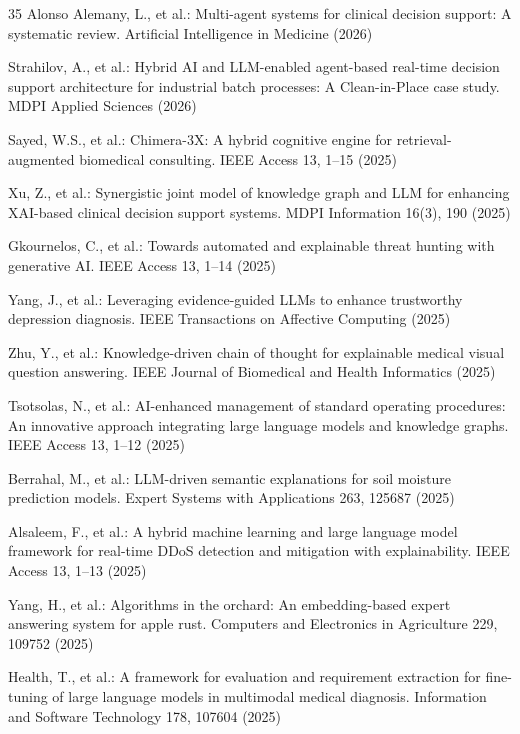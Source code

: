 \documentclass[lnbip]{svmultln}
\begin{document}
\begin{thebibliography}{35}
 Alonso Alemany, L., et al.: Multi-agent systems for clinical decision support: A systematic review. Artificial Intelligence in Medicine (2026)

 Strahilov, A., et al.: Hybrid AI and LLM-enabled agent-based real-time decision support architecture for industrial batch processes: A Clean-in-Place case study. MDPI Applied Sciences (2026)

 Sayed, W.S., et al.: Chimera-3X: A hybrid cognitive engine for retrieval-augmented biomedical consulting. IEEE Access 13, 1--15 (2025)

 Xu, Z., et al.: Synergistic joint model of knowledge graph and LLM for enhancing XAI-based clinical decision support systems. MDPI Information 16(3), 190 (2025)

 Gkournelos, C., et al.: Towards automated and explainable threat hunting with generative AI. IEEE Access 13, 1--14 (2025)

 Yang, J., et al.: Leveraging evidence-guided LLMs to enhance trustworthy depression diagnosis. IEEE Transactions on Affective Computing (2025)

 Zhu, Y., et al.: Knowledge-driven chain of thought for explainable medical visual question answering. IEEE Journal of Biomedical and Health Informatics (2025)

 Tsotsolas, N., et al.: AI-enhanced management of standard operating procedures: An innovative approach integrating large language models and knowledge graphs. IEEE Access 13, 1--12 (2025)

 Berrahal, M., et al.: LLM-driven semantic explanations for soil moisture prediction models. Expert Systems with Applications 263, 125687 (2025)

 Alsaleem, F., et al.: A hybrid machine learning and large language model framework for real-time DDoS detection and mitigation with explainability. IEEE Access 13, 1--13 (2025)

 Yang, H., et al.: Algorithms in the orchard: An embedding-based expert answering system for apple rust. Computers and Electronics in Agriculture 229, 109752 (2025)

 Health, T., et al.: A framework for evaluation and requirement extraction for fine-tuning of large language models in multimodal medical diagnosis. Information and Software Technology 178, 107604 (2025)


\end{thebibliography}
\end{document}
